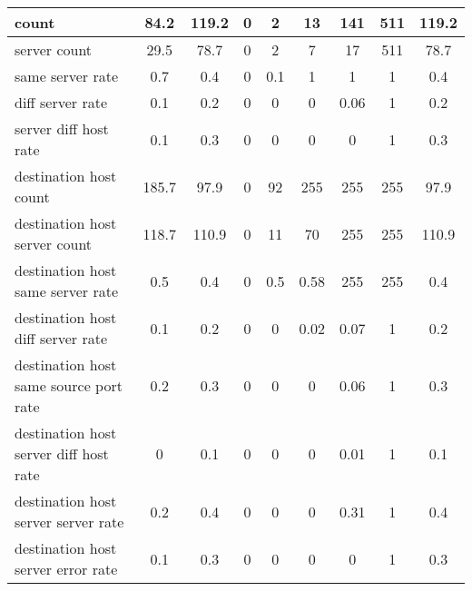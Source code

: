 \documentclass[conference]{IEEEtran}
\begin{document}
\begin{strip}
\begin{center}
\begin{tabular}{l|c|c|c|c|c|c|c|c}
            \hline
            \small count& \small 84.2& \small 119.2& \small 0& \small 2& \small 13& \small 141& \small 511& \small 119.2\\
            \hline
            \small server count& \small 29.5& \small 78.7& \small 0& \small 2& \small 7& \small 17& \small 511& \small 78.7\\
            \hline
            \small same server rate& \small 0.7& \small 0.4& \small 0& \small 0.1& \small 1& \small 1& \small 1& \small 0.4\\
            \hline
            \small diff server rate& \small 0.1& \small 0.2& \small 0& \small 0& \small 0& \small 0.06& \small 1& \small 0.2\\
            \hline
            \small server diff host rate& \small 0.1& \small 0.3& \small 0& \small 0& \small 0& \small 0& \small 1& \small 0.3\\
            \hline
            \small destination host count& \small 185.7& \small 97.9& \small 0& \small 92& \small 255& \small 255& \small 255& \small 97.9\\
            \hline
            \small destination host server count& \small 118.7& \small 110.9& \small 0& \small 11& \small 70& \small 255& \small 255& \small 110.9\\
            \hline
            \small destination host same server rate& \small 0.5& \small 0.4& \small 0& \small 0.5& \small 0.58& \small 255& \small 255& \small 0.4\\
            \hline
            \small destination host diff server rate& \small 0.1& \small 0.2& \small 0& \small 0& \small 0.02& \small 0.07& \small 1& \small 0.2\\
            \hline
            \small destination host same source port rate& \small 0.2& \small 0.3& \small 0& \small 0& \small 0& \small 0.06& \small 1& \small 0.3\\
            \hline
            \small destination host server diff host rate& \small 0& \small 0.1& \small 0& \small 0& \small 0& \small 0.01& \small 1& \small 0.1\\
            \hline
            \small destination host server server rate& \small 0.2& \small 0.4& \small 0& \small 0& \small 0& \small 0.31& \small 1& \small 0.4\\
            \hline
            \small destination host server error rate& \small 0.1& \small 0.3& \small 0& \small 0& \small 0& \small 0& \small 1& \small 0.3\\
            \hline
        \end{tabular}
    \end{center}
\end{strip}
\end{document}
